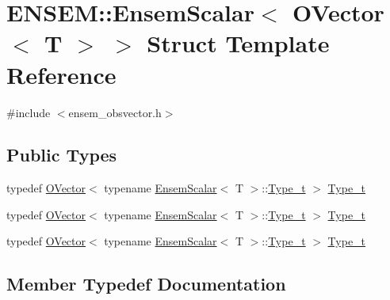 \hypertarget{structENSEM_1_1EnsemScalar_3_01OVector_3_01T_01_4_01_4}{}\section{E\+N\+S\+EM\+:\+:Ensem\+Scalar$<$ O\+Vector$<$ T $>$ $>$ Struct Template Reference}
\label{structENSEM_1_1EnsemScalar_3_01OVector_3_01T_01_4_01_4}


{\ttfamily \#include $<$ensem\+\_\+obsvector.\+h$>$}

\subsection*{Public Types}
\begin{DoxyCompactItemize}
\item 
typedef \mbox{\hyperlink{classENSEM_1_1OVector}{O\+Vector}}$<$ typename \mbox{\hyperlink{structENSEM_1_1EnsemScalar}{Ensem\+Scalar}}$<$ T $>$\+::\mbox{\hyperlink{structENSEM_1_1EnsemScalar_3_01OVector_3_01T_01_4_01_4_a5b4151f8ecc24331a77edc8130f525f7}{Type\+\_\+t}} $>$ \mbox{\hyperlink{structENSEM_1_1EnsemScalar_3_01OVector_3_01T_01_4_01_4_a5b4151f8ecc24331a77edc8130f525f7}{Type\+\_\+t}}
\item 
typedef \mbox{\hyperlink{classENSEM_1_1OVector}{O\+Vector}}$<$ typename \mbox{\hyperlink{structENSEM_1_1EnsemScalar}{Ensem\+Scalar}}$<$ T $>$\+::\mbox{\hyperlink{structENSEM_1_1EnsemScalar_3_01OVector_3_01T_01_4_01_4_a5b4151f8ecc24331a77edc8130f525f7}{Type\+\_\+t}} $>$ \mbox{\hyperlink{structENSEM_1_1EnsemScalar_3_01OVector_3_01T_01_4_01_4_a5b4151f8ecc24331a77edc8130f525f7}{Type\+\_\+t}}
\item 
typedef \mbox{\hyperlink{classENSEM_1_1OVector}{O\+Vector}}$<$ typename \mbox{\hyperlink{structENSEM_1_1EnsemScalar}{Ensem\+Scalar}}$<$ T $>$\+::\mbox{\hyperlink{structENSEM_1_1EnsemScalar_3_01OVector_3_01T_01_4_01_4_a5b4151f8ecc24331a77edc8130f525f7}{Type\+\_\+t}} $>$ \mbox{\hyperlink{structENSEM_1_1EnsemScalar_3_01OVector_3_01T_01_4_01_4_a5b4151f8ecc24331a77edc8130f525f7}{Type\+\_\+t}}
\end{DoxyCompactItemize}


\subsection{Member Typedef Documentation}
\mbox{\label{structENSEM_1_1EnsemScalar_3_01OVector_3_01T_01_4_01_4_a5b4151f8ecc24331a77edc8130f525f7}} 

